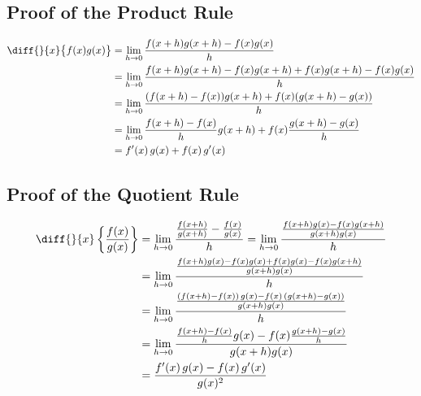 \subsection*{Proof of the Product Rule}
\begin{align*}
\diff{}{x} \big\{f(x)g(x)\big\} &= \lim_{h\to 0}\frac{f(x+h)g(x+h) - f(x)g(x)}{h} \\
&=\lim_{h\to 0}\frac{f(x+h)g(x+h) - f(x)g(x+h) + f(x)g(x+h) - f(x)g(x)}{h} \\
&=\lim_{h\to 0}\frac{(f(x+h)- f(x))g(x+h) + f(x)(g(x+h) - g(x))}{h} \\
&=\lim_{h\to 0}\frac{f(x+h)- f(x)}{h}g(x+h) + f(x)\frac{g(x+h) - g(x)}{h} \\
&= f'(x)\, g(x) + f(x)\,g'(x)
\end{align*}
\subsection*{Proof of the Quotient Rule}
\begin{align*}
\diff{}{x} \left\{ \frac{f(x)}{g(x)} \right\} &= \lim_{h\to 0}\frac{\frac{f(x+h)}{g(x+h)} - \frac{f(x)}{g(x)}}{h} =\lim_{h\to 0}\frac{\frac{f(x+h)g(x) - f(x)g(x+h)}{g(x+h)g(x)}}{h} \\
&=\lim_{h\to 0}\frac{\frac{f(x+h)g(x) - f(x)g(x) + f(x)g(x) - f(x)g(x+h)}{g(x+h)g(x)}}{h} \\
&=\lim_{h\to 0}\frac{\frac{(f(x+h) - f(x))\,g(x) - f(x)\,(g(x + h) - g(x))}{g(x+h)g(x)}}{h} \\
&=\lim_{h\to 0}\frac{\frac{f(x+h) - f(x)}{h}g(x) - f(x)\frac{g(x + h) - g(x)}{h}}{g(x+h)g(x)} \\
&= \frac{f'(x) \, g(x) - f(x) \, g'(x)}{g(x)^2}
\end{align*}
